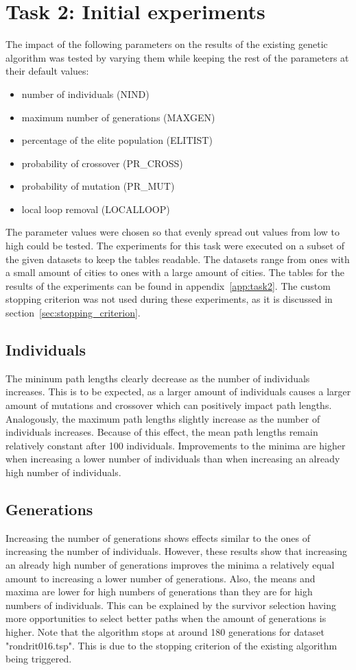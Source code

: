\documentclass{report}
\begin{document}
\section{Task 2: Initial experiments}
The impact of the following parameters on the results of the existing genetic algorithm was tested by varying them while keeping the rest of the parameters at their default values:
\begin{itemize}
	\item number of individuals (NIND)
	\item maximum number of generations (MAXGEN)
	\item percentage of the elite population (ELITIST)
	\item probability of crossover (PR\_CROSS)
	\item probability of mutation (PR\_MUT)
	\item local loop removal (LOCALLOOP)
\end{itemize}
The parameter values were chosen so that evenly spread out values from low to high could be tested. The experiments for this task were executed on a subset of the given datasets to keep the tables readable. The datasets range from ones with a small amount of cities to ones with a large amount of cities. The tables for the results of the experiments can be found in appendix~\ref{app:task2}. The custom stopping criterion was not used during these experiments, as it is discussed in section~\ref{sec:stopping_criterion}.

\subsection{Individuals}
The mininum path lengths clearly decrease as the number of individuals increases. This is to be expected, as a larger amount of individuals causes a larger amount of mutations and crossover which can positively impact path lengths. Analogously, the maximum path lengths slightly increase as the number of individuals increases. Because of this effect, the mean path lengths remain relatively constant after 100 individuals. Improvements to the minima are higher when increasing a lower number of individuals than when increasing an already high number of individuals.

\subsection{Generations}
Increasing the number of generations shows effects similar to the ones of increasing the number of individuals. However, these results show that increasing an already high number of generations improves the minima a relatively equal amount to increasing a lower number of generations. Also, the means and maxima are lower for high numbers of generations than they are for high numbers of individuals. This can be explained by the survivor selection having more opportunities to select better paths when the amount of generations is higher.
Note that the algorithm stops at around 180 generations for dataset "rondrit016.tsp". This is due to the stopping criterion of the existing algorithm being triggered.
\end{document}
